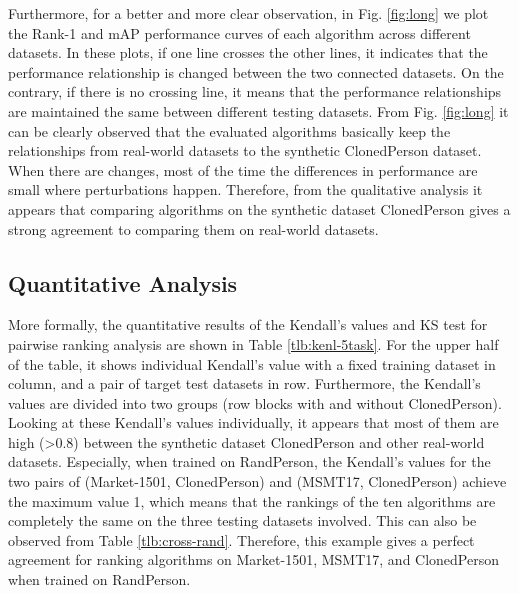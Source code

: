 \documentclass[10pt,twocolumn,letterpaper]{article}
\begin{document}
Furthermore, for a better and more clear observation, in Fig. \ref{fig:long} we plot the Rank-1 and mAP performance curves of each algorithm across different datasets. In these plots, if one line crosses the other lines, it indicates that the performance relationship is changed between the two connected datasets. On the contrary, if there is no crossing line, it means that the performance relationships are maintained the same between different testing datasets. From Fig. \ref{fig:long} it can be clearly observed that the evaluated algorithms basically keep the relationships from real-world datasets to the synthetic ClonedPerson dataset. When there are changes, most of the time the differences in performance are small where perturbations happen. Therefore, from the qualitative analysis it appears that comparing algorithms on the synthetic dataset ClonedPerson gives a strong agreement to comparing them on real-world datasets.



\subsection{Quantitative Analysis} 

More formally, the quantitative results of the Kendall's  values and KS test for pairwise ranking analysis are shown in Table \ref{tlb:kenl-5task}. For the upper half of the table, it shows individual Kendall's  value with a fixed training dataset in column, and a pair of target test datasets in row. Furthermore, the Kendall's  values are divided into two groups (row blocks with and without ClonedPerson). Looking at these Kendall's  values individually, it appears that most of them are high (>0.8) between the synthetic dataset ClonedPerson and other real-world datasets. Especially, when trained on RandPerson, the Kendall's  values for the two pairs of (Market-1501, ClonedPerson) and (MSMT17, ClonedPerson) achieve the maximum value 1, which means that the rankings of the ten algorithms are completely the same on the three testing datasets involved. This can also be observed from Table \ref{tlb:cross-rand}. Therefore, this example gives a perfect agreement for ranking algorithms on Market-1501, MSMT17, and ClonedPerson when trained on RandPerson.
\end{document}
